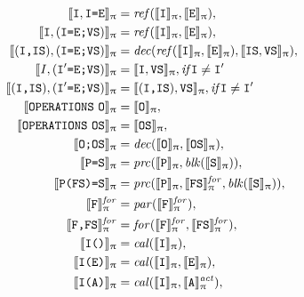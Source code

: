 \documentclass[a4paper,openany]{book}
\begin{document}
\begin{PiDen}
{\begin{align}
%
\PIDEN{\mathtt{I}, \mathtt{I} \mbox{\tt =} \mathtt{E}} & =  \mathit{ref}(\PIDEN{\mathtt{I}}, \PIDEN{\mathtt{E}}), \\
%
\PIDEN{\mathtt{I}, (\mathtt{I} \mbox{\tt =} \mathtt{E} \mbox{\tt ;} \mathtt{VS})} & =  \mathit{ref}(\PIDEN{\mathtt{I}}, \PIDEN{\mathtt{E}}), \\
%
\PIDEN{(\mathtt{I} \mbox{\tt ,} \mathtt{IS}), (\mathtt{I} \mbox{\tt =} \mathtt{E} \mbox{\tt ;} \mathtt{VS})} & =  \mathit{dec}(\mathit{ref}(\PIDEN{\mathtt{I}}, \PIDEN{\mathtt{E}}), \PIDEN{\mathtt{IS}, \mathtt{VS}}), \\
%
\PIDEN{\mathit{I}, (\mathtt{I'} \mbox{\tt =} \mathtt{E} \mbox{\tt ;} \mathtt{VS})} & =  \PIDEN{\mathtt{I}, \mathtt{VS}}, \mathit{if} \mathtt{I} \not=\mathtt{I'} \\
%
\PIDEN{(\mathtt{I} \mbox{\tt ,} \mathtt{IS}), (\mathtt{I'} \mbox{\tt =} \mathtt{E} \mbox{\tt ;} \mathtt{VS})} & =  \PIDEN{(\mathtt{I} \mbox{\tt ,} \mathtt{IS}), \mathtt{VS}}, \mathit{if} \mathtt{I} \not=\mathtt{I'} \\
%
%
\PIDEN{\mbox{\tt OPERATIONS} ~\mathtt{O}} & =  \PIDEN{\mathtt{O}}, \\ 
%
\PIDEN{\mbox{\tt OPERATIONS} ~\mathtt{OS}} & =  \PIDEN{\mathtt{OS}}, \\ 
%
\PIDEN{\mathtt{O} \mbox{\tt ;} \mathtt{OS}} & =  \mathit{dec}(\PIDEN{\mathtt{O}}, \PIDEN{\mathtt{OS}}), \\ 
%
\PIDEN{\mathtt{P} \mbox{\tt=} \mathtt{S}} & =  \mathit{prc}(\PIDEN{\mathtt{P}}, \mathit{blk}(\PIDEN{\mathtt{S}})), \\
%
\PIDEN{\mathtt{P} \mbox{\tt(} \mathtt{FS} \mbox{\tt)} \mbox{\tt=} \mathtt{S}} & =  \mathit{prc}(\PIDEN{\mathtt{P}}, \PIDEN{\mathtt{FS}}^\mathit{for}, \mathit{blk}(\PIDEN{\mathtt{S}})), \\ 
%
\PIDEN{\mathtt{F}}^\mathit{for} & =  \mathit{par}(\PIDEN{\mathtt{F}}^\mathit{for}), \\
%
\PIDEN{\mathtt{F}\mbox{\tt ,} \mathtt{FS}}^\mathit{for} & =  \mathit{for}(\PIDEN{\mathtt{F}}^\mathit{for}, \PIDEN{\mathtt{FS}}^\mathit{for}), \\
%
%
\llbracket \mathtt{I} \mbox{\tt(}\mbox{\tt)}  \rrbracket_\uppi & =  \mathit{cal}(\llbracket \mathtt{I}\rrbracket_\uppi), \\
%
\llbracket \mathtt{I} \mbox{\tt(}\mathtt{E} \mbox{\tt)} \rrbracket_\uppi & =  \mathit{cal}(\llbracket \mathtt{I} \rrbracket_\uppi, \llbracket \mathtt{E}\rrbracket_\uppi ), \\
%
\llbracket \mathtt{I} \mbox{\tt(}\mathtt{A} \mbox{\tt)}  \rrbracket_\uppi & =  \mathit{cal}(\llbracket \mathtt{I}\rrbracket_\uppi, \llbracket \mathtt{A}\rrbracket^\mathit{act}_\uppi ), \\

\end{align}}
\end{PiDen}
\end{document}
